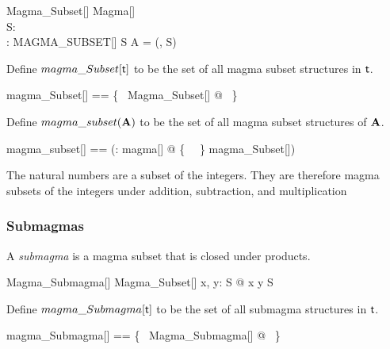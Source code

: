 \documentclass{amsart}
\begin{document}
\begin{schema}{Magma\_Subset}[\genT]
	Magma[\genT] \\
	S: \power \genT \\
	\strucS: MAGMA\_SUBSET[\genT]
\where
	S \subseteq A
\also
	\strucS = (\strucA, S)
\end{schema}

Define $magma\_Subset[\mathsf{t}]$ to be the set of all magma subset structures in $\mathsf{t}$.

\begin{zed}
	magma\_Subset[\genT] == \{~ Magma\_Subset[\genT] @ \strucS ~\}
\end{zed}

Define $magma\_subset(\mathbf{A})$ to be the set of all magma subset structures of $\mathbf{A}$.

\begin{zed}
	magma\_subset[\genT] == (\lambda \strucA: magma[\genT] @ \{~ \strucA ~\} \dres magma\_Subset[\genT])
\end{zed}

\begin{example}
The natural numbers are a subset of the integers.
They are therefore magma subsets of the integers under addition, subtraction, and multiplication


\end{example}

\subsubsection{Submagmas}

A \textit{submagma} is a magma subset that is closed under products.

\begin{schema}{Magma\_Submagma}[\genT]
	Magma\_Subset[\genT]
\where
	\forall x, y: S @ x \opG y \in S
\end{schema}

Define $magma\_Submagma[\mathsf{t}]$ to be the set of all submagma structures in $\mathsf{t}$.

\begin{zed}
	magma\_Submagma[\genT] == \{~ Magma\_Submagma[\genT] @ \strucS ~\}
\end{zed}
\end{document}
